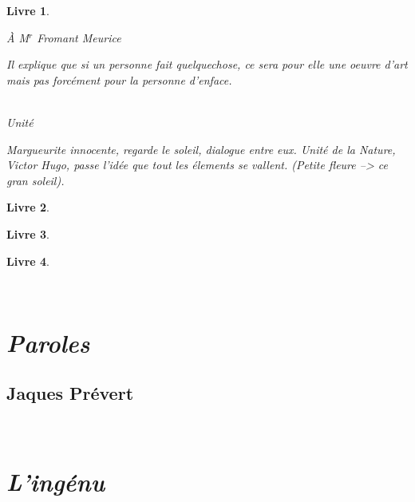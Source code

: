 \documentclass[12pt,a4paper]{article}
\newtheorem{li}{Livre}
\begin{document}
\begin{li}
{}
	\textsc{}
	{\selectfont
	\`A M$^r$ Fromant Meurice\par
	Il explique que si un personne fait quelquechose, ce sera pour elle une oeuvre d'art mais pas forcément pour la personne d'enface. \\ \\
}
	\textsc{}
	{\selectfont
	Unité\par
	Margueurite innocente, regarde le soleil, dialogue entre eux.
	Unité de la Nature, Victor Hugo, passe l'idée que tout les élements se vallent. (Petite fleure --> ce gran soleil).



}
\end{li}
\begin{li}
{\selectfont 


}
\end{li}
\begin{li}
{\selectfont 


}
\end{li}
\begin{li}
{\selectfont 


}
\end{li}



\\ \newpage



\section {\textit{Paroles}}
	\subsection{Jaques Pr\'evert}
{\selectfont 



}
\\ \newpage


\section {\textit{L'ing\'enu}}
\end{document}
